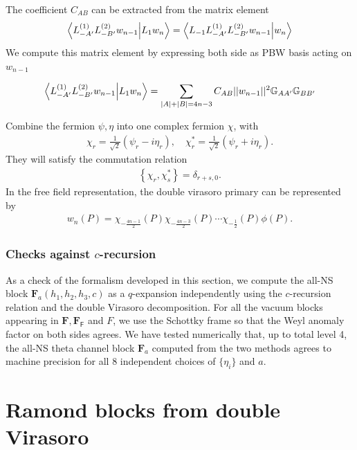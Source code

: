 \documentclass[12pt]{article}
\newcommand{\ie}{\begin{equation}\begin{aligned}}
\newcommand{\fe}{\end{aligned}\end{equation}}
\numberwithin{equation}{section}
\begin{document}
The coefficient $C_{AB}$ can be extracted from the matrix element
\ie
\braket{ L_{-A'}^{(1)} L_{-B'}^{(2)}  w_{n-1}}{L_1 w_n} = \braket{L_{-1} L_{-A'}^{(1)} L_{-B'}^{(2)}  w_{n-1}}{w_n}
\fe
We compute this matrix element by expressing both side as PBW basis acting on $w_{n-1}$




\ie
\braket{ L_{-A'}^{(1)} L_{-B'}^{(2)}  w_{n-1}}{L_1 w_n} =\sum_{|A|+|B|=4n-3} C_{AB} ||w_{n-1}||^2 \mathbb{G}_{AA'} \mathbb{G}_{BB'}
\fe


Combine the fermion $\psi, \eta$ into one complex fermion $ \chi$, with
\ie
 \chi_{r} =\frac{1}{\sqrt{2}}( \psi_r - i\eta_r), \quad  \chi^*_{r} =\frac{1}{\sqrt{2}}( \psi_r +i\eta_r).
\fe
They will satisfy the commutation relation
\ie
\left\{ \chi_{r},\chi^*_{s}\right\} = \delta_{r+s,0}.
\fe
In the free field representation, the double virasoro primary can be represented by
\ie
w_n(P)=\chi_{-\frac{4n-1}{2}}(P)\chi_{-\frac{4n-3}{2}}(P)\cdots \chi_{-\frac{1}{2}}(P)\phi(P).
\fe


\subsubsection*{Checks against $c$-recursion}

As a check of the formalism developed in this section, we compute the all-NS block $\mathbf{F}_a(h_1, h_2, h_3, c)$ as a $q$-expansion independently using the $c$-recursion relation and the double Virasoro decomposition. For all the vacuum blocks appearing in $\mathbf{F},\mathbf{F}_{\mathsf{F}}$ and $F$, we use the Schottky frame so that the Weyl anomaly factor on both sides agrees. We have tested numerically that, up to total level 4, the all-NS theta channel block $\mathbf{F}_a$ computed from the two methods agrees to machine precision for all 8 independent choices of $\{\eta_i\}$ and $a$. 

\section{Ramond blocks from double Virasoro}
\end{document}
